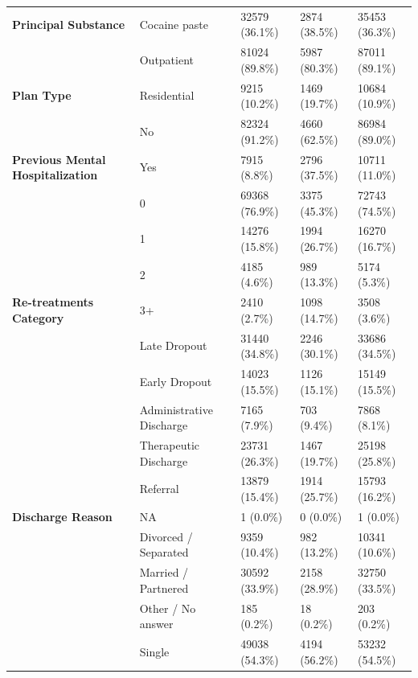 \documentclass[
  spanish,
  10pt,
]{article}
\begin{document}
\begin{table}[H]
{\begin{tabular}[t]{>{}lllll}
\cmidrule{2-5}
\multirow[t]{-6}{*}{\raggedright\arraybackslash \textbf{Principal Substance}} & Cocaine paste & 32579 (36.1\%) & 2874 (38.5\%) & 35453 (36.3\%)\\
\cmidrule{1-5}
 & Outpatient & 81024 (89.8\%) & 5987 (80.3\%) & 87011 (89.1\%)\\
\cmidrule{2-5}
\multirow[t]{-2}{*}{\raggedright\arraybackslash \textbf{Plan Type}} & Residential & 9215 (10.2\%) & 1469 (19.7\%) & 10684 (10.9\%)\\
\cmidrule{1-5}
 & No & 82324 (91.2\%) & 4660 (62.5\%) & 86984 (89.0\%)\\
\cmidrule{2-5}
\multirow[t]{-2}{*}{\raggedright\arraybackslash \textbf{Previous Mental Hospitalization}} & Yes & 7915 (8.8\%) & 2796 (37.5\%) & 10711 (11.0\%)\\
\cmidrule{1-5}
 & 0 & 69368 (76.9\%) & 3375 (45.3\%) & 72743 (74.5\%)\\
\cmidrule{2-5}
 & 1 & 14276 (15.8\%) & 1994 (26.7\%) & 16270 (16.7\%)\\
\cmidrule{2-5}
 & 2 & 4185 (4.6\%) & 989 (13.3\%) & 5174 (5.3\%)\\
\cmidrule{2-5}
\multirow[t]{-4}{*}{\raggedright\arraybackslash \textbf{Re-treatments Category}} & 3+ & 2410 (2.7\%) & 1098 (14.7\%) & 3508 (3.6\%)\\
\cmidrule{1-5}
 & Late Dropout & 31440 (34.8\%) & 2246 (30.1\%) & 33686 (34.5\%)\\
\cmidrule{2-5}
 & Early Dropout & 14023 (15.5\%) & 1126 (15.1\%) & 15149 (15.5\%)\\
\cmidrule{2-5}
 & Administrative Discharge & 7165 (7.9\%) & 703 (9.4\%) & 7868 (8.1\%)\\
\cmidrule{2-5}
 & Therapeutic Discharge & 23731 (26.3\%) & 1467 (19.7\%) & 25198 (25.8\%)\\
\cmidrule{2-5}
 & Referral & 13879 (15.4\%) & 1914 (25.7\%) & 15793 (16.2\%)\\
\cmidrule{2-5}
\multirow[t]{-6}{*}{\raggedright\arraybackslash \textbf{Discharge Reason}} & NA & 1 (0.0\%) & 0 (0.0\%) & 1 (0.0\%)\\
\cmidrule{1-5}
 & Divorced / Separated & 9359 (10.4\%) & 982 (13.2\%) & 10341 (10.6\%)\\
\cmidrule{2-5}
 & Married / Partnered & 30592 (33.9\%) & 2158 (28.9\%) & 32750 (33.5\%)\\
\cmidrule{2-5}
 & Other / No answer & 185 (0.2\%) & 18 (0.2\%) & 203 (0.2\%)\\
\cmidrule{2-5}
 & Single & 49038 (54.3\%) & 4194 (56.2\%) & 53232 (54.5\%)\\

\end{tabular}}
\end{table}
\end{document}
